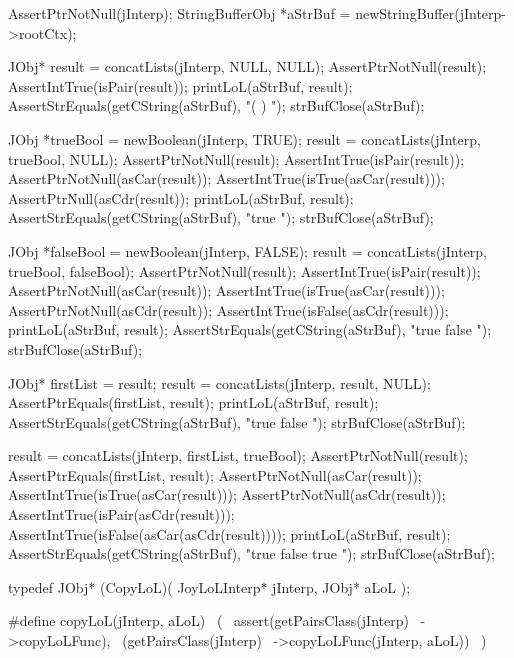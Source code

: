 \stopCCode

\startCTest
  AssertPtrNotNull(jInterp);
  StringBufferObj *aStrBuf = newStringBuffer(jInterp->rootCtx);
  
  JObj* result = concatLists(jInterp, NULL, NULL);
  AssertPtrNotNull(result);
  AssertIntTrue(isPair(result));
  printLoL(aStrBuf, result);
  AssertStrEquals(getCString(aStrBuf), "( ) ");
  strBufClose(aStrBuf);
  
  JObj *trueBool  = newBoolean(jInterp, TRUE);
  result = concatLists(jInterp, trueBool, NULL);
  AssertPtrNotNull(result);
  AssertIntTrue(isPair(result));
  AssertPtrNotNull(asCar(result));
  AssertIntTrue(isTrue(asCar(result)));
  AssertPtrNull(asCdr(result));
  printLoL(aStrBuf, result);
  AssertStrEquals(getCString(aStrBuf), "true ");
  strBufClose(aStrBuf);
  
  JObj *falseBool = newBoolean(jInterp, FALSE);
  result = concatLists(jInterp, trueBool, falseBool);
  AssertPtrNotNull(result);
  AssertIntTrue(isPair(result));
  AssertPtrNotNull(asCar(result));
  AssertIntTrue(isTrue(asCar(result)));
  AssertPtrNotNull(asCdr(result));
  AssertIntTrue(isFalse(asCdr(result)));
  printLoL(aStrBuf, result);
  AssertStrEquals(getCString(aStrBuf), "true false ");
  strBufClose(aStrBuf);
  
  JObj* firstList = result;
  result = concatLists(jInterp, result, NULL);
  AssertPtrEquals(firstList, result);
  printLoL(aStrBuf, result);
  AssertStrEquals(getCString(aStrBuf), "true false ");
  strBufClose(aStrBuf);
  
  result = concatLists(jInterp, firstList, trueBool);
  AssertPtrNotNull(result);
  AssertPtrEquals(firstList, result);
  AssertPtrNotNull(asCar(result));
  AssertIntTrue(isTrue(asCar(result)));
  AssertPtrNotNull(asCdr(result));
  AssertIntTrue(isPair(asCdr(result)));
  AssertIntTrue(isFalse(asCar(asCdr(result))));
  printLoL(aStrBuf, result);
  AssertStrEquals(getCString(aStrBuf), "true false true ");
  strBufClose(aStrBuf);
\stopCTest
\stopTestCase
\stopTestSuite

\startTestSuite[copyLoL]

\startCHeader
typedef JObj* (CopyLoL)(
  JoyLoLInterp* jInterp,
  JObj* aLoL
);

#define copyLoL(jInterp, aLoL)      \
  (                                 \
    assert(getPairsClass(jInterp)   \
      ->copyLoLFunc),               \
    (getPairsClass(jInterp)         \
      ->copyLoLFunc(jInterp, aLoL)) \
  )
\stopCHeader

